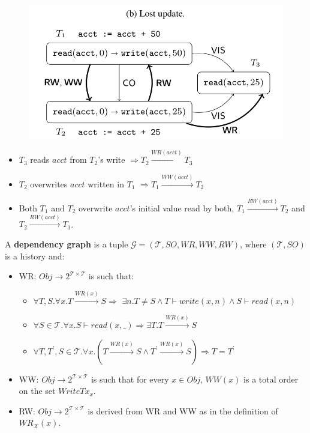 \documentclass{beamer}
\begin{document}
\begin{frame}
	\begin{figure}
		\includegraphics[scale=0.3]{fig2b}
	\end{figure}
	\begin{example}
		\begin{itemize}
			\item $T_3$ reads $acct$ from $T_2$'s write $\Rightarrow T_2 \xrightarrow{WR(acct)} T_3$
			\item $T_2$ overwrites $acct$ written in $T_1$ $\Rightarrow T_1 \xrightarrow{WW(acct)} T_2$
			\item Both $T_1$ and $T_2$ overwrite $acct$'s initial value read by both, $T_1 \xrightarrow{RW(acct)} T_2$ and $T_2 \xrightarrow{RW(acct)} T_1$.
		\end{itemize}
	\end{example}
\end{frame}

\begin{frame}
	\begin{definition}
		A \textbf{dependency graph} is a tuple $\mathcal{G} = (\mathcal{T}, SO, WR, WW, RW)$, where $(\mathcal{T}, SO)$ is a history and:
		\begin{itemize}
			\item<1> WR: $Obj \rightarrow 2^{\mathcal{T} \times \mathcal{T}}$ is such that:
			\begin{itemize}
				\item $\forall T,S. \forall x . T \xrightarrow{WR(x)}S \Rightarrow $ 
					  $	\exists n. T \ne S \wedge T \vdash write(x,n) \wedge S \vdash read(x,n)$
				\item $\forall S \in \mathcal{T}. \forall x. S \vdash read(x,\_) \Rightarrow \exists T. T \xrightarrow{WR(x)} S $
				\item $\forall T, T^\prime, S \in \mathcal{T}. \forall x. \left( T \xrightarrow{WR(x)} S \wedge T^\prime \xrightarrow{WR(x)} S \right) \Rightarrow T = T^\prime $
			\end{itemize}
		\pause
		\item<2> WW: $Obj \rightarrow 2^{\mathcal{T} \times \mathcal{T}}$ is such that for every $x \in Obj$, $WW(x)$ is a total order on the set $WriteTx_x$.
		\pause
		\item<3> RW: $Obj \rightarrow 2^{\mathcal{T} \times \mathcal{T}}$ is derived from WR and WW as in the definition of $WR_\mathcal{X}(x)$.
		\end{itemize}
	\end{definition}
\end{frame}
\end{document}
